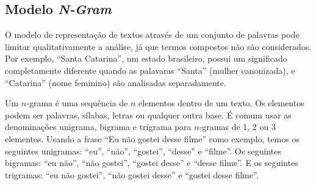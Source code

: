 \subsection{Modelo \textit{N-Gram}}

O modelo de representação de textos através de um conjunto de palavras pode limitar qualitativamente a análise, já que termos compostos não são considerados. Por exemplo, ``Santa Catarina'', um estado brasileiro, possui um significado completamente diferente quando as palavaras ``Santa'' (mulher canonizada), e ``Catarina'' (nome feminino) são analisadas separadamente.

Um \(n\)-grama é uma sequência de \(n\) elementos dentro de um texto. Os elementos podem ser palavras, sílabas, letras ou qualquer outra base. É comum usar as denominações unigrama, bigrama e trigrama para \(n\)-gramas de 1, 2 ou 3 elementos. Usando a frase ``Eu não gostei desse filme'' como exemplo, temos os seguintes unigramas: ``eu'', ``não'', ``gostei'', ``desse'' e ``filme''. Os seguintes bigramas: ``eu não'', ``não gostei'', ``gostei desse'' e ``desse filme''. E os seguintes trigramas: ``eu não gostei'', ``não gostei desse'' e ``gostei desse filme''.
